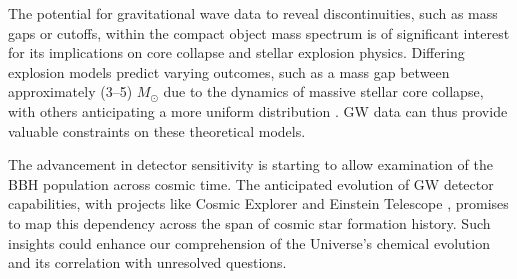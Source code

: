 The potential for gravitational wave data to reveal discontinuities, such as mass gaps or cutoffs, within the compact object mass spectrum is of significant interest for its implications on core collapse and stellar explosion physics. Differing explosion models predict varying outcomes, such as a mass gap between approximately (3--5) $M_{\odot}$ due to the dynamics of massive stellar core collapse, with others anticipating a more uniform distribution \cite{Fryer:2011cx}. GW data can thus provide valuable constraints on these theoretical models.

The advancement in detector sensitivity is starting to allow examination of the BBH population across cosmic time. The anticipated evolution of GW detector capabilities, with projects like Cosmic Explorer and Einstein Telescope \cite{Reitze:2019iox, Maggiore:2019uih}, promises to map this dependency across the span of cosmic star formation history. Such insights could enhance our comprehension of the Universe's chemical evolution and its correlation with unresolved questions. 


